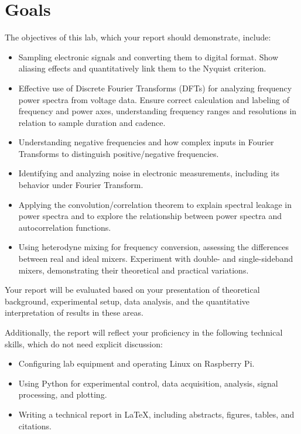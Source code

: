 \documentclass[11pt,preprint]{aastex}
\begin{document}
\section{Goals} \label{goals}

\noindent
The objectives of this lab, which your report should demonstrate, include:

\begin{itemize}
    \item Sampling electronic signals and converting them to digital format. Show aliasing effects and quantitatively link them to the Nyquist criterion.
    \item Effective use of Discrete Fourier Transforms (DFTs) for analyzing frequency power spectra from voltage data. Ensure correct calculation and labeling of frequency and power axes, understanding frequency ranges and resolutions in relation to sample duration and cadence.
    \item Understanding negative frequencies and how complex inputs in Fourier Transforms to distinguish positive/negative frequencies.
    \item Identifying and analyzing noise in electronic measurements, including its behavior under Fourier Transform.
    \item Applying the convolution/correlation theorem to explain spectral leakage in power spectra and to explore the relationship between power spectra and autocorrelation functions.
    \item Using heterodyne mixing for frequency conversion, assessing the differences between real and ideal mixers. Experiment with double- and single-sideband mixers, demonstrating their theoretical and practical variations.
\end{itemize}

\noindent
Your report will be evaluated based on your presentation of theoretical background, experimental setup, data analysis, and the quantitative interpretation of results in these areas.

Additionally, the report will reflect your proficiency in the following technical skills, which do not need explicit discussion:

\begin{itemize}
    \item Configuring lab equipment and operating Linux on Raspberry Pi.
    \item Using Python for experimental control, data acquisition, analysis, signal processing, and plotting.
    \item Writing a technical report in \LaTeX, including abstracts, figures, tables, and citations.
\end{itemize}
\end{document}
